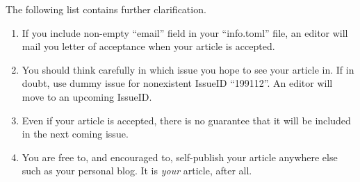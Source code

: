 The following list contains further clarification.

\begin{enumerate}
    \item If you include non-empty ``email'' field in your ``info.toml'' file, an editor will mail you letter of acceptance when your article is accepted.
    \item You should think carefully in which issue you hope to see your article in. If in doubt, use dummy issue for nonexistent IssueID ``199112''.
    An editor will move to an upcoming IssueID.
    \item Even if your article is accepted, there is no guarantee that it will be included in the next coming issue.
    \item You are free to, and encouraged to, self-publish your article anywhere else such as your personal blog. It is \emph{your} article, after all.
\end{enumerate}



